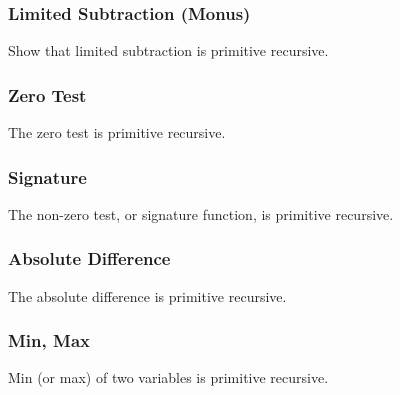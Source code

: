 \documentclass{beamer}
\begin{document}
\begin{frame}
	\frametitle{Limited Subtraction (Monus)}

	Show that limited subtraction is primitive recursive. 

	\vspace{7cm}


\end{frame}

\begin{frame}
	\frametitle{Zero Test}

	The zero test is primitive recursive. 

	\vspace{7cm}


\end{frame}

\begin{frame}
	\frametitle{Signature}

	The non-zero test, or signature function, is primitive recursive. 

	\vspace{7cm}



\end{frame}

\begin{frame}
	\frametitle{Absolute Difference}

	The absolute difference is primitive recursive. 

	\vspace{7cm}



\end{frame}

\begin{frame}
	\frametitle{Min, Max}

	Min (or max) of two variables is primitive recursive. 

	\vspace{7cm}



\end{frame}
\end{document}
